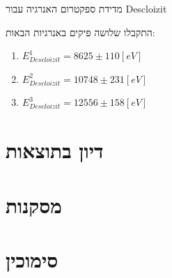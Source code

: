 \documentclass{article}
\begin{document}
\begin{enumerate}
\begin{graph}[H]
    \caption{מדידת ספקטרום האנרגיה עבור 
    \textenglish{Descloizit}
    }
    \label{graph:Descloizit-spec}
    \end{graph}
    התקבלו שלושה פיקים באנרגיות הבאות:
    \begin{enumerate}
    \item $E_{Descloizit}^1 = 8625 \pm 110 [eV]$
    \item $E_{Descloizit}^2 = 10748 \pm 231 [eV]$
    \item $E_{Descloizit}^3 = 12556 \pm 158 [eV]$
    \end{enumerate}
\end{enumerate}

\section{דיון בתוצאות}

\section{מסקנות}

\section*{סימוכין}
\begin{english}
\printbibliography[heading=none]{}
\end{english}
\end{document}
